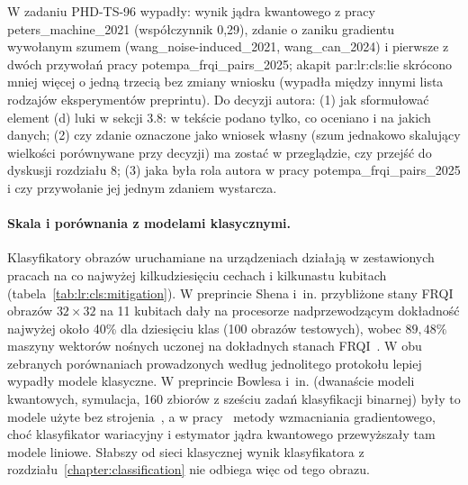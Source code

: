 {W zadaniu PHD-TS-96 wypadły: wynik jądra kwantowego z pracy peters_machine_2021 (współczynnik 0,29), zdanie o zaniku gradientu wywołanym szumem (wang_noise-induced_2021, wang_can_2024) i pierwsze z dwóch przywołań pracy potempa_frqi_pairs_2025; akapit par:lr:cls:lie skrócono mniej więcej o jedną trzecią bez zmiany wniosku (wypadła między innymi lista rodzajów eksperymentów preprintu).
Do decyzji autora:
(1) jak sformułować element (d) luki w sekcji 3.8: w tekście podano tylko, co oceniano i na jakich danych;
(2) czy zdanie oznaczone jako wniosek własny (szum jednakowo skalujący wielkości porównywane przy decyzji) ma zostać w przeglądzie, czy przejść do dyskusji rozdziału 8;
(3) jaka była rola autora w pracy potempa_frqi_pairs_2025 i czy przywołanie jej jednym zdaniem wystarcza.
}

\paragraph{Skala i porównania z modelami klasycznymi.}
Klasyfikatory obrazów uruchamiane na urządzeniach działają w zestawionych pracach na co najwyżej kilkudziesięciu cechach i kilkunastu kubitach (tabela~\ref{tab:lr:cls:mitigation}).
W preprincie Shena i~in. przybliżone stany FRQI obrazów $32\times32$ na 11 kubitach dały na procesorze nadprzewodzącym dokładność najwyżej około 40\% dla dziesięciu klas (100 obrazów testowych), wobec $89{,}48\%$ maszyny wektorów nośnych uczonej na dokładnych stanach FRQI~\cite{shen_classification_2024}.
W obu zebranych porównaniach prowadzonych według jednolitego protokołu lepiej wypadły modele klasyczne.
W preprincie Bowlesa i~in. (dwanaście modeli kwantowych, symulacja, 160 zbiorów z sześciu zadań klasyfikacji binarnej) były to modele użyte bez strojenia~\cite{bowles_better_2024}, a w pracy~\cite{e25070992} metody wzmacniania gradientowego, choć klasyfikator wariacyjny i estymator jądra kwantowego przewyższały tam modele liniowe.
Słabszy od sieci klasycznej wynik klasyfikatora z rozdziału~\ref{chapter:classification} nie odbiega więc od tego obrazu.

